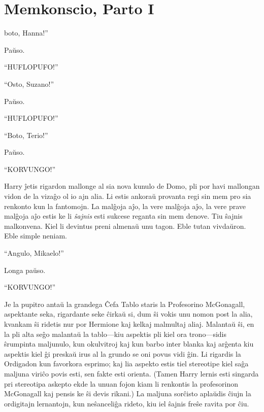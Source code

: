 \chapter{Memkonscio, Parto I}

boto, Hanna!''

\hplettrineextrapara
Paŭso.

``HUFLOPUFO!''

``Osto, Suzano!''

Paŭso.

``HUFLOPUFO!''

``Boto, Terio!''

Paŭso.

``KORVUNGO!''

Harry ĵetis rigardon mallonge al sia nova kunulo de Domo, pli por havi
mallongan vidon de la vizaĝo ol io ajn alia. Li estis ankoraŭ provanta
regi sin mem pro sia renkonto kun la fantomojn. La malĝoja aĵo, la
vere malĝoja aĵo, la vere prave malĝoja aĵo estis ke li \emph{ŝajnis}
esti sukcese reganta sin mem denove. Tiu ŝajnis malkonvena. Kiel li
devintus preni almenaŭ unu tagon. Eble tutan vivdaŭron. Eble simple
neniam.

``Angulo, Mikaelo!''

Longa paŭso.

``KORVUNGO!''

Je la pupitro antaŭ la grandega Ĉefa Tablo staris la Profesorino
McGonagall, aspektante seka, rigardante seke ĉirkaŭ si, dum ŝi vokis
unu nomon post la alia, kvankam ŝi ridetis nur por Hermione kaj kelkaj
malmultaj aliaj. Malantaŭ ŝi, en la pli alta seĝo malantaŭ la
tablo—kiu aspektis pli kiel ora trono—sidis ŝrumpinta maljunulo, kun
okulvitroj kaj kun barbo inter blanka kaj arĝenta kiu aspektis kiel ĝi
preskaŭ irus al la grundo se oni povus vidi ĝin. Li rigardis la
Ordigadon kun favorkora esprimo; kaj lia aspekto estis tiel stereotipe
kiel saĝa maljuna viriĉo povis esti, sen fakte esti orienta. (Tamen
Harry lernis esti singarda pri stereotipa askepto ekde la unuan fojon
kiam li renkontis la profesorinon McGonagall kaj pensis ke ŝi devis
rikani.) La maljuna sorĉisto aplaŭdis ĉiujn la ordigitajn lernantojn,
kun neŝanceliĝa rideto, kiu iel ŝajnis freŝe ravita por ĉiu.

